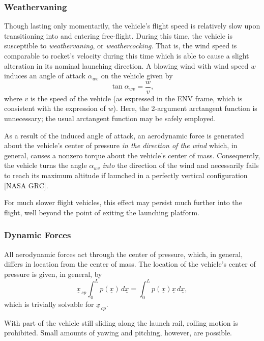 \documentclass[11pt,dvipsnames]{thesis}
\begin{document}
\subsubsection{Weathervaning}
Though lasting only momentarily, the vehicle's flight speed is relatively slow upon transitioning into and entering free-flight. During this time, the vehicle is susceptible to \textit{weathervaning}, or \textit{weathercocking}. That is, the wind speed is comparable to rocket's velocity during this time which is able to cause a slight alteration in its nominal launching direction. A blowing wind with wind speed $w$ induces an angle of attack $\alpha_{wv}$ on the vehicle given by
\begin{equation}
\tan\alpha_{wv} = \frac{w}{v},
\end{equation}
where $v$ is the speed of the vehicle (as expressed in the ENV frame, which is consistent with the expression of $w$). Here, the 2-argument arctangent function is unnecessary; the usual arctangent function may be safely employed.

As a result of the induced angle of attack, an aerodynamic force is generated about the vehicle's center of pressure \textit{in the direction of the wind} which, in general, causes a nonzero torque about the vehicle's center of mass. Consequently, the vehicle turns the angle $\alpha_{wv}$ \textit{into} the direction of the wind and necessarily fails to reach its maximum altitude if launched in a perfectly vertical configuration [NASA GRC].

For much slower flight vehicles, this effect may persist much further into the flight, well beyond the point of exiting the launching platform.

\subsubsection{Dynamic Forces}
All aerodynamic forces act through the center of pressure, which, in general, differs in location from the center of mass. 
The location of the vehicle's center of pressure is given, in general, by
\begin{equation}
\underline{x}_{\,cp} \int_0^L p(\underline{x})\,d\underline{x} = \int_0^L p(\underline{x})\underline{x}\,d\underline{x},
\end{equation}
which is trivially solvable for $\underline{x}_{\,cp}$.

With part of the vehicle still sliding along the launch rail, rolling motion is prohibited. Small amounts of yawing and pitching, however, are possible.
\end{document}
